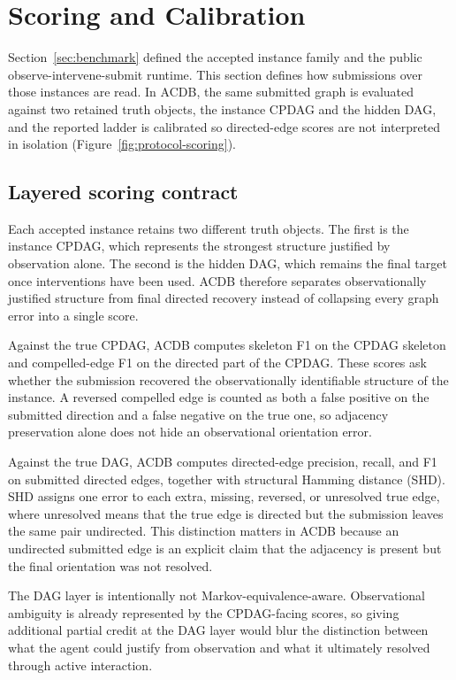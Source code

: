 \section{Scoring and Calibration}
\label{sec:scoring}

Section~\ref{sec:benchmark} defined the accepted instance family and the public observe-intervene-submit runtime. This section defines how submissions over those instances are read. In ACDB, the same submitted graph is evaluated against two retained truth objects, the instance CPDAG and the hidden DAG, and the reported ladder is calibrated so directed-edge scores are not interpreted in isolation (Figure~\ref{fig:protocol-scoring}).



\subsection{Layered scoring contract}

Each accepted instance retains two different truth objects. The first is the instance CPDAG, which represents the strongest structure justified by observation alone. The second is the hidden DAG, which remains the final target once interventions have been used. ACDB therefore separates observationally justified structure from final directed recovery instead of collapsing every graph error into a single score.

Against the true CPDAG, ACDB computes skeleton F1 on the CPDAG skeleton and compelled-edge F1 on the directed part of the CPDAG. These scores ask whether the submission recovered the observationally identifiable structure of the instance. A reversed compelled edge is counted as both a false positive on the submitted direction and a false negative on the true one, so adjacency preservation alone does not hide an observational orientation error.

Against the true DAG, ACDB computes directed-edge precision, recall, and F1 on submitted directed edges, together with structural Hamming distance (SHD). SHD assigns one error to each extra, missing, reversed, or unresolved true edge, where unresolved means that the true edge is directed but the submission leaves the same pair undirected. This distinction matters in ACDB because an undirected submitted edge is an explicit claim that the adjacency is present but the final orientation was not resolved.

The DAG layer is intentionally not Markov-equivalence-aware. Observational ambiguity is already represented by the CPDAG-facing scores, so giving additional partial credit at the DAG layer would blur the distinction between what the agent could justify from observation and what it ultimately resolved through active interaction.

